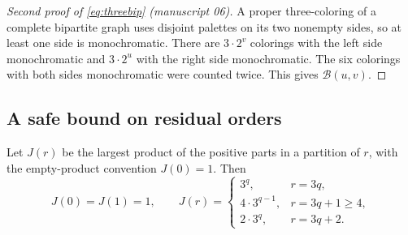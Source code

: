 \documentclass[11pt,a4paper]{article}
\numberwithin{equation}{section}
\theoremstyle{definition}
\theoremstyle{remark}
\newcommand{\Bip}{\mathcal B}
\begin{document}
\begin{proof}[Second proof of \eqref{eq:threebip} (manuscript 06)]
A proper three-coloring of a complete bipartite graph uses disjoint palettes
on its two nonempty sides, so at least one side is monochromatic. There are
$3\cdot2^v$ colorings with the left side monochromatic and $3\cdot2^u$ with
the right side monochromatic. The six colorings with both sides monochromatic
were counted twice. This gives $\Bip(u,v)$.
\end{proof}

\subsection{A safe bound on residual orders}\label{tor:sec:residual}

Let $J(r)$ be the largest product of the positive parts in a partition of
$r$, with the empty-product convention $J(0)=1$. Then
\begin{equation}\label{tor:eq:J}
 J(0)=J(1)=1,\qquad
 J(r)=
 \begin{cases}
 3^q,&r=3q,\\
 4\cdot3^{q-1},&r=3q+1\ge4,\\
 2\cdot3^q,&r=3q+2.
 \end{cases}
\end{equation}
\end{document}
